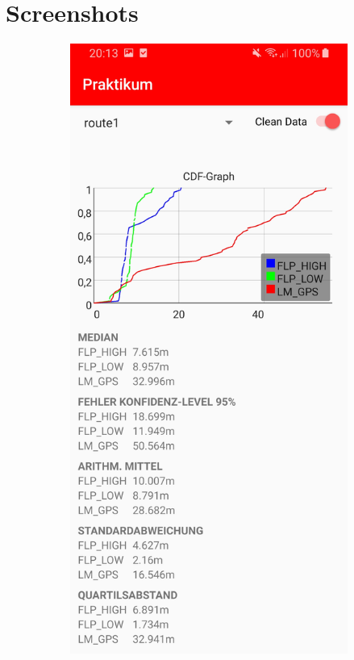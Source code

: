 \newpage
\section{Screenshots}

\begin{figure}[h!]
    \centering
    \begin{subfigure}[b]{0.35\textwidth}
        \includegraphics[width=\textwidth]{screenshot_route1}

\end{subfigure}
\end{figure}
